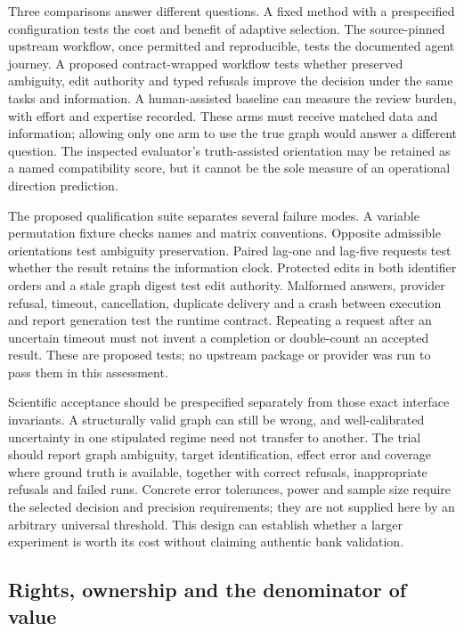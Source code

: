 Three comparisons answer different questions. A fixed method with a
prespecified configuration tests the cost and benefit of adaptive selection.
The source-pinned upstream workflow, once permitted and reproducible, tests
the documented agent journey. A proposed contract-wrapped workflow tests
whether preserved ambiguity, edit authority and typed refusals improve the
decision under the same tasks and information. A human-assisted baseline
can measure the review burden, with effort and expertise recorded. These
arms must receive matched data and information; allowing only one arm to use
the true graph would answer a different question. The inspected evaluator's
truth-assisted orientation may be retained as a named compatibility score,
but it cannot be the sole measure of an operational direction prediction.
\citep{exec17_copilot_code,exec25_copilot_choice}

The proposed qualification suite separates several failure modes. A variable
permutation fixture checks names and matrix conventions. Opposite admissible
orientations test ambiguity preservation. Paired lag-one and lag-five
requests test whether the result retains the information clock. Protected
edits in both identifier orders and a stale graph digest test edit authority.
Malformed answers, provider refusal, timeout, cancellation, duplicate delivery
and a crash between execution and report generation test the runtime
contract. Repeating a request after an uncertain timeout must not invent a
completion or double-count an accepted result. These are proposed tests; no
upstream package or provider was run to pass them in this assessment.
\citep{exec25_copilot_choice}

Scientific acceptance should be prespecified separately from those exact
interface invariants. A structurally valid graph can still be wrong, and
well-calibrated uncertainty in one stipulated regime need not transfer to
another. The trial should report graph ambiguity, target identification,
effect error and coverage where ground truth is available, together with
correct refusals, inappropriate refusals and failed runs. Concrete error
tolerances, power and sample size require the selected decision and precision
requirements; they are not supplied here by an arbitrary universal threshold.
This design can establish whether a larger experiment is worth its cost
without claiming authentic bank validation.~\citep{exec25_copilot_choice}

\subsection{Rights, ownership and the denominator of value}

